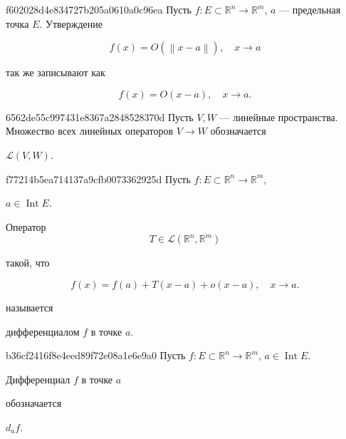 \begin{note}{f602028d4e834727b205a0610a0c96ea}
    Пусть \({ f : E \subset \mathbb R^{n} \to \mathbb R^{m} }\), \({ a }\) --- предельная точка \({ E }\).
    Утверждение
    \begin{icloze}{2}
        \[
            f(x) = O(\left\lVert x - a \right\rVert), \quad x \to a
        \]
    \end{icloze}
    так же записывают как
    \begin{icloze}{1}
        \[
            f(x) = O(x - a), \quad x \to a.
        \]
    \end{icloze}
\end{note}

\begin{note}{6562de55c997431e8367a2848528370d}
    Пусть \({ V, W }\) --- линейные пространства.
    Множество всех линейных операторов \({ V \to W }\) обозначается \begin{icloze}{1}\({ \mathcal L(V, W) }\).\end{icloze}
\end{note}

\begin{note}{f77214b5ea714137a9cfb0073362925d}
    Пусть \({ f : E  \subset \mathbb R^{n} \to \mathbb R^{m} }\), \begin{icloze}{4}\({ a \in \operatorname{Int} E }\).\end{icloze}
    \begin{icloze}{3}Оператор
        \[
            T \in \mathcal L(\mathbb R^{n}, \mathbb R^{m})
        \]
    \end{icloze} такой, что
    \begin{icloze}{2}
        \[
            f(x) = f(a) + T(x - a) + o(x - a), \quad x \to a.
        \]
    \end{icloze}
    называется \begin{icloze}{1}дифференциалом \({ f }\) в точке \({ a }\).\end{icloze}
\end{note}

\begin{note}{b36cf2416f8e4eed89f72e08a1e6e9a0}
    Пусть \({ f : E  \subset \mathbb R^{n} \to \mathbb R^{m} }\), \({ a \in \operatorname{Int} E }\).
    \begin{icloze}{2}Дифференциал \({ f }\) в точке \({ a }\)\end{icloze} обозначается \begin{icloze}{1}\({ d_a f }\).\end{icloze}
\end{note}

